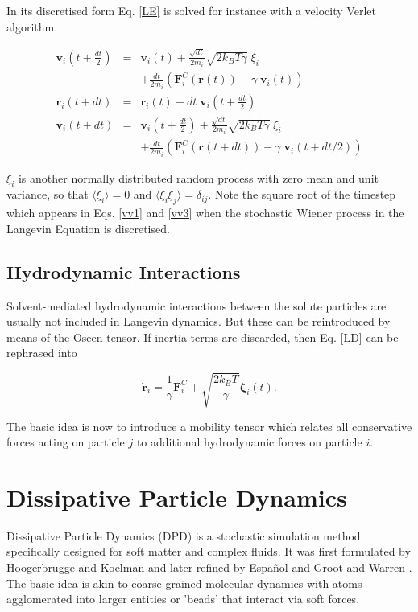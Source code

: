 \documentclass[8.5pt,twoside,twocolumn]{article}
\newcommand{\beq}{\begin{equation}}
\newcommand{\eeq}{\end{equation}}
\newcommand{\beqa}{\begin{eqnarray}}
\newcommand{\eeqa}{\end{eqnarray}}
\begin{document}
In its discretised form Eq. \ref{LE} is solved for instance with a velocity Verlet algorithm.

\beqa
\mathbf{v}_i(t+\frac{dt}{2})&=&\mathbf{v}_i(t)+ \frac{\sqrt{dt}}{2 m_i} \sqrt{2 k_B T \gamma}\; \xi_i \nonumber\\
&& + \frac{dt}{2 m_i} (\mathbf{F}_i^C(\mathbf{r}(t)) -\gamma\; \mathbf{v}_i(t))\label{vv1} \\
\mathbf{r}_i(t+dt)&=& \mathbf{r}_i(t) + dt\;\mathbf{v}_i(t+\frac{dt}{2})\label{vv2}\\ 
\mathbf{v}_i(t+dt)&=& \mathbf{v}_i(t+\frac{dt}{2}) + \frac{\sqrt{dt}}{2 m_i} \sqrt{2 k_B T \gamma}\; \xi_i\nonumber\\
&& + \frac{dt}{2 m_i} (\mathbf{F}_i^C(\mathbf{r}(t+dt)) -\gamma\; \mathbf{v}_i(t+dt/2))\label{vv3}
\eeqa

$\xi_i$ is another normally distributed random process with zero mean and unit variance, 
so that $\langle \xi_i \rangle=0$ and $\langle \xi_i \xi_j\rangle=\delta_{ij}$. 
Note the square root of the timestep which appears in Eqs. \ref{vv1} and \ref{vv3} 
when the stochastic Wiener process in the Langevin Equation is discretised.

\subsection{Hydrodynamic Interactions}

Solvent-mediated hydrodynamic interactions between the solute particles are usually not included
 in Langevin dynamics. But these can be reintroduced by means of the Oseen tensor. If inertia 
terms are discarded, then Eq. \ref{LD} can be rephrased into

\beq
\dot{\mathbf{r}}_i = \frac{1}{\gamma} \mathbf{F}_i^C +\sqrt{\frac{2 k_B T}{\gamma}} \mathbf{\zeta}_i(t).
\eeq

The basic idea is now to introduce a mobility tensor which relates all conservative forces acting on particle $j$ to 
additional hydrodynamic forces on particle $i$. 


\section{Dissipative Particle Dynamics}

Dissipative Particle Dynamics (DPD) is a stochastic simulation method specifically designed for soft matter
and complex fluids. It was first formulated by Hoogerbrugge and Koelman 
\cite{Hoogerbrugge:1992, Koelman:1993} and later refined by Espa\~nol \cite{Espanol:1995b} and 
Groot and Warren \cite{Groot:1997}.
The basic idea is akin to coarse-grained molecular dynamics with atoms agglomerated into larger
entities or 'beads' that interact via soft forces. 
\end{document}
